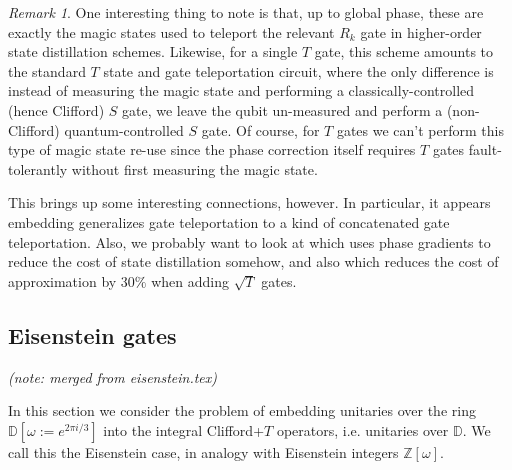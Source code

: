 \documentclass{article}
\theoremstyle{definition}
\theoremstyle{theorem}
\theoremstyle{remark}
\newtheorem{remark}{Remark}
\begin{document}
\begin{remark}
One interesting thing to note is that, up to global phase, these are exactly the magic states used to teleport the relevant $R_k$ gate in higher-order state distillation schemes. Likewise, for a single $T$ gate, this scheme amounts to the standard $T$ state and gate teleportation circuit, where the only difference is instead of measuring the magic state and performing a classically-controlled (hence Clifford) $S$ gate, we leave the qubit un-measured and perform a (non-Clifford) quantum-controlled $S$ gate. Of course, for $T$ gates we can't perform this type of magic state re-use since the phase correction itself requires $T$ gates fault-tolerantly without first measuring the magic state.

This brings up some interesting connections, however. In particular, it appears embedding generalizes gate teleportation to a kind of concatenated gate teleportation. Also, we probably want to look at \cite{phasegradientdistill} which uses phase gradients to reduce the cost of state distillation somehow, and also \cite{hierarchysynth} which reduces the cost of approximation by $30\%$ when adding $\sqrt{T}$ gates.
\end{remark}

\subsection{Eisenstein gates}

\emph{(note: merged from eisenstein.tex)}

In this section we consider the problem of embedding unitaries over the ring $\mathbb{D}[\omega := e^{2\pi i/3}]$ into the integral Clifford+$T$ operators, i.e. unitaries over $\mathbb{D}$. We call this the Eisenstein case, in analogy with Eisenstein integers $\mathbb{Z}[\omega]$.
\end{document}
